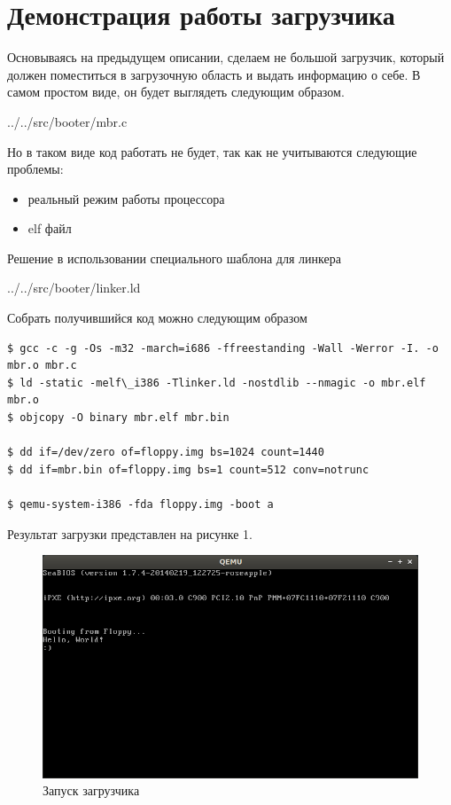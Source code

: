 \newpage
\section{Демонстрация работы загрузчика}

Основываясь на предыдущем описании, сделаем не большой загрузчик, который должен поместиться в загрузочную область и выдать информацию о себе. В самом простом виде, он будет выглядеть следующим образом.


{../../src/booter/mbr.c}

Но в таком виде код работать не будет, так как не учитываются следующие проблемы:
\begin{itemize}
\item реальный режим работы процессора
\item elf файл
\end{itemize}

Решение в использовании специального шаблона для линкера


{../../src/booter/linker.ld}

Собрать получившийся код можно следующим образом

\begin{Verbatim}[frame=single]
$ gcc -c -g -Os -m32 -march=i686 -ffreestanding -Wall -Werror -I. -o mbr.o mbr.c
$ ld -static -melf\_i386 -Tlinker.ld -nostdlib --nmagic -o mbr.elf mbr.o
$ objcopy -O binary mbr.elf mbr.bin

$ dd if=/dev/zero of=floppy.img bs=1024 count=1440
$ dd if=mbr.bin of=floppy.img bs=1 count=512 conv=notrunc

$ qemu-system-i386 -fda floppy.img -boot a
\end{Verbatim}

Результат загрузки представлен на рисунке 1.

\begin{figure}[h!]
\centering
\includegraphics[scale=0.7]{res/qemu}
\caption{Запуск загрузчика}
\end{figure}
